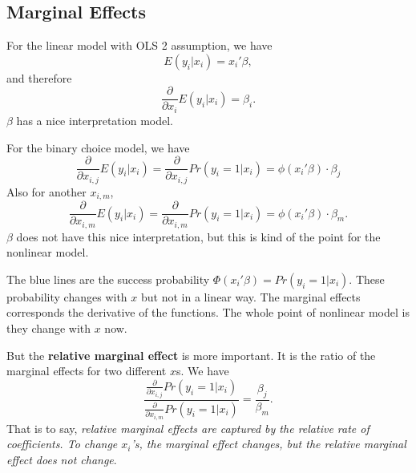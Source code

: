 \documentclass[11pt,a4paper]{amsart}
\theoremstyle{plain}
\theoremstyle{definition}
\begin{document}
\subsection{Marginal Effects}
	For the linear model with OLS 2 assumption, we have 
	\[	E(y_{i}|x_{i}) = x_{i}'\beta,	\]
	and therefore
	\[	\frac{\partial}{\partial x_{i}} E(y_{i}|x_{i}) = \beta_{i}.	\]
	$\beta$ has a nice interpretation model. \par 
	For the binary choice model, we have 
	\[		\frac{\partial}{\partial x_{i,j}} E(y_{i}|x_{i}) = 	\frac{\partial}{\partial x_{i,j}} Pr(y_{i}=1|x_{i}) = \phi(x_{i}'\beta) \cdot \beta_{j}	\]
	Also for another $x_{i,m}$, 
	\[		\frac{\partial}{\partial x_{i,m}} E(y_{i}|x_{i}) = 	\frac{\partial}{\partial x_{i,m}} Pr(y_{i}=1|x_{i}) = \phi(x_{i}'\beta) \cdot \beta_{m}.	\]
		$\beta$ does not have this nice interpretation, but this is kind of the point for the nonlinear model. \par 
		The blue lines are the success probability $\Phi(x_{i}'\beta) = Pr(y_{i}=1|x_{i})$. These probability changes with $x$ but not in a linear way. The marginal effects corresponds the derivative of the functions. The whole point of nonlinear model is they change with $x$ now.\par 
		But the \textbf{relative marginal effect} is more important. It is the ratio of the marginal effects for two different $x$s. We have 
		\[	\frac{	\frac{\partial}{\partial x_{i,j}} Pr(y_{i}=1|x_{i}) }{	\frac{\partial}{\partial x_{i,m}} Pr(y_{i}=1|x_{i})} = \frac{\beta_{j}}{\beta_{m}}.	\]
		That is to say, \emph{relative marginal effects are captured by the relative rate of coefficients. To change $x_{i}$'s, the marginal effect changes, but the relative marginal effect does not change}.
\end{document}
